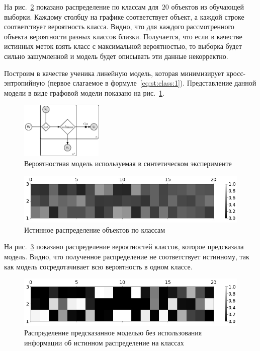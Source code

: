 На рис.~\ref{fg:ex:synt:distr:real} показано распределение по классам для~$20$ объектов из обучающей выборки. Каждому столбцу на графике соответствует объект, а каждой строке соответствует вероятность класса. Видно, что для каждого рассмотренного объекта вероятности разных классов близки. Получается, что если в качестве истинных меток взять класс с максимальной вероятностью, то выборка будет сильно зашумленной и модель будет описывать эти данные некорректно.

Построим в качестве ученика линейную модель, которая минимизирует кросс-энтропийную (первое слагаемое в формуле~\eqref{eq:st:class:1}). Представление данной модели в виде графовой модели показано на рис.~\ref{fg:ex:synt:plate}.

\begin{figure}[h!t]\center
\includegraphics[width=0.35\textwidth]{results/privlearn/linear_model}
\caption{Вероятностная модель используемая в синтетическом эксперименте}
\label{fg:ex:synt:plate}
\end{figure}

\begin{figure}[h!t]\center
\includegraphics[width=1\textwidth]{results/privlearn/syn_real_distr}
\caption{Истинное распределение  объектов по классам}
\label{fg:ex:synt:distr:real}
\end{figure}


На рис.~\ref{fg:ex:synt:distr:without} показано распределение вероятностей классов, которое предсказала модель. Видно, что полученное распределение не соответствует истинному, так как модель сосредотачивает всю вероятность в одном классе.

\begin{figure}[h!t]\center
\includegraphics[width=1\textwidth]{results/privlearn/syn_without_teacher_distr}
\caption{Распределение предсказанное моделью без использования информации об истинном распределение на классах}
\label{fg:ex:synt:distr:without}
\end{figure}

